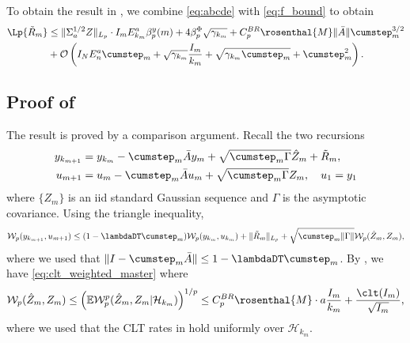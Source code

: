 \documentclass[11pt]{article}
\begin{document}
To obtain the result in , we combine \eqref{eq:abcde} with \eqref{eq:f_bound} to obtain
\begin{align*}
    \Lp{\tilde{R}_m} 
    &\leq \lVert \Sigma_a^{1/2}Z \rVert_{L_p} \cdot I_m E_{k_m}^a \beta_p^y (m) + 4 \beta_p^{\Phi} \sqrt{\gamma_{k_m}}
    + 
    C_p^{BR} \rosenthal{M}\lVert \bar{A} \rVert \cumstep_m^{3/2}  \\ 
    &
    + \mathcal{O}\left(
    I_N E_n^a \cumstep_m +
    \sqrt{\gamma_{k_m}} \frac{I_m}{k_m} + \sqrt{\gamma_{k_m} \cumstep_m}
    + \cumstep_m^2
    \right)
    .
\end{align*}



\subsection{Proof of }\label{app:Wp_recursion}
The result is proved by a comparison argument. 
Recall the two recursions
\begin{equation}\label{eq:thm1_dt_recursions}
\begin{split}
    y_{k_{m+1}} &= y_{k_m} - \cumstep_m \bar{A} y_m + \sqrt{\cumstep_m \Gamma} \hat{Z}_m + \tilde{R}_m, 
    \\ 
    u_{m+1} &= u_m - \cumstep_m \bar{A} u_m + \sqrt{\cumstep_m \Gamma} Z_m , \quad u_1 = y_1
\end{split}
\end{equation}
where $\{Z_m\}$ is an iid standard Gaussian sequence and $\Gamma$ is the asymptotic covariance. 
Using the triangle inequality,
\begin{equation}\label{eq:Wp_triangle_inequality}
    \mathcal{W}_{p} (y_{k_{m+1}},  u_{m+1})
    \leq (1 - \lambdaDT \cumstep_m) \mathcal{W}_{p} (y_{k_m},  u_{k_m})
    + \lVert \tilde{R}_m \rVert_{L_p} 
    + \sqrt{\cumstep_m \lVert \Gamma \rVert} \mathcal{W}_{p} (\hat{Z}_m, Z_m),     
\end{equation}
where we used that $\lVert I - \cumstep_m \bar{A} \rVert \leq 1 - \lambdaDT \cumstep_m$. 
By , we have \eqref{eq:clt_weighted_master} where
\begin{align*}
    \mathcal{W}_{p} (\hat{Z}_m, Z_m) 
    \leq
    \left(\mathbb{E} \mathcal{W}_{p}^{p} (\hat{Z}_m, Z_m | \mathcal{H}_{k_m})\right)^{1/{p}}
    \leq 
     C_{p}^{BR} \rosenthal{M} \cdot a \frac{I_m}{k_m} + \frac{\clt(I_m)}{\sqrt{I_m}} , 
\end{align*}
where we used that the CLT rates in  hold uniformly over $\mathcal{H}_{k_m}$.
\end{document}
